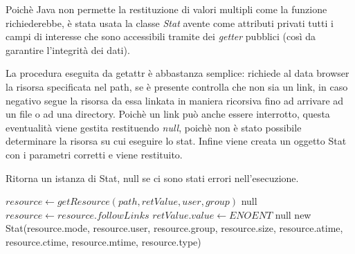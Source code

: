 Poichè Java non permette la restituzione di valori multipli come la funzione richiederebbe, è stata usata la classe \emph{Stat} avente come attributi privati tutti i campi di interesse che sono accessibili tramite dei \emph{getter} pubblici (così da garantire l'integrità dei dati).

La procedura eseguita da getattr è abbastanza semplice: richiede al data browser la risorsa specificata nel path, se è presente controlla che non sia un link, in caso negativo segue la risorsa da essa linkata in maniera ricorsiva fino ad arrivare ad un file o ad una directory. Poichè un link può anche essere interrotto, questa eventualità viene gestita restituendo \emph{null}, poichè non è stato possibile determinare la risorsa su cui eseguire lo stat. Infine viene creata un oggetto Stat con i parametri corretti e viene restituito.
\begin{algorithm}
\begin{algorithmic}
\caption{Ritorna un istanza di Stat, null se ci sono stati errori nell'esecuzione.}
	\State $resource \gets getResource(path, retValue, user, group)$
		\State \Return null
	\EndIf
		\State $resource \gets resource.followLinks$
	\EndIf
		\State $retValue.value \gets ENOENT$
		\State \Return null
	\EndIf
	\State \Return new Stat(resource.mode, resource.user, resource.group, resource.size, resource.atime, resource.ctime, resource.mtime, resource.type)
\EndFunction
\end{algorithmic}
\end{algorithm}